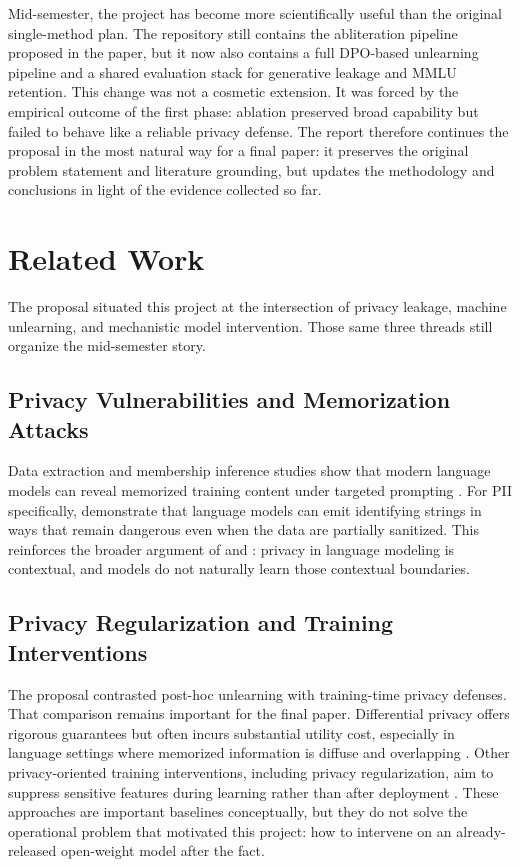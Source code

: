 \documentclass[11pt]{article}
\begin{document}
Mid-semester, the project has become more scientifically useful than the original single-method plan. The repository still contains the abliteration pipeline proposed in the paper, but it now also contains a full DPO-based unlearning pipeline and a shared evaluation stack for generative leakage and MMLU retention. This change was not a cosmetic extension. It was forced by the empirical outcome of the first phase: ablation preserved broad capability but failed to behave like a reliable privacy defense. The report therefore continues the proposal in the most natural way for a final paper: it preserves the original problem statement and literature grounding, but updates the methodology and conclusions in light of the evidence collected so far.

\section{Related Work}

The proposal situated this project at the intersection of privacy leakage, machine unlearning, and mechanistic model intervention. Those same three threads still organize the mid-semester story.

\subsection{Privacy Vulnerabilities and Memorization Attacks}

Data extraction and membership inference studies show that modern language models can reveal memorized training content under targeted prompting \citep{carlini2021extracting, shokri2017membership, mireshghallah2022quantifying}. For PII specifically, \citet{lukas2023analyzing} demonstrate that language models can emit identifying strings in ways that remain dangerous even when the data are partially sanitized. This reinforces the broader argument of \citet{brown2022does} and \citet{mireshghallah2023can}: privacy in language modeling is contextual, and models do not naturally learn those contextual boundaries.

\subsection{Privacy Regularization and Training Interventions}

The proposal contrasted post-hoc unlearning with training-time privacy defenses. That comparison remains important for the final paper. Differential privacy offers rigorous guarantees but often incurs substantial utility cost, especially in language settings where memorized information is diffuse and overlapping \citep{abadi2016deep, bagdasaryan2019differential}. Other privacy-oriented training interventions, including privacy regularization, aim to suppress sensitive features during learning rather than after deployment \citep{mireshghallah2021privacy}. These approaches are important baselines conceptually, but they do not solve the operational problem that motivated this project: how to intervene on an already-released open-weight model after the fact.
\end{document}
